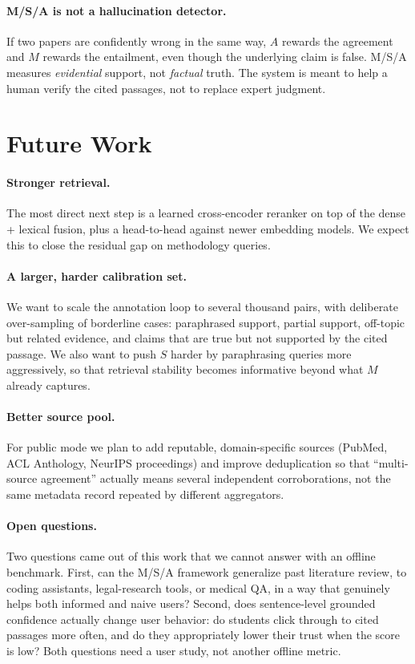 \documentclass[10pt]{article}
\begin{document}
\paragraph{M/S/A is not a hallucination detector.}
If two papers are confidently wrong in the same way, $A$ rewards the
agreement and $M$ rewards the entailment, even though the underlying
claim is false. M/S/A measures \emph{evidential} support, not
\emph{factual} truth. The system is meant to help a human verify the
cited passages, not to replace expert judgment.

\section{Future Work}
\label{sec:future}

\paragraph{Stronger retrieval.}
The most direct next step is a learned cross-encoder reranker on top
of the dense + lexical fusion, plus a head-to-head against newer
embedding models. We expect this to close the residual gap on
methodology queries.

\paragraph{A larger, harder calibration set.}
We want to scale the annotation loop to several thousand pairs, with
deliberate over-sampling of borderline cases: paraphrased support,
partial support, off-topic but related evidence, and claims that are
true but not supported by the cited passage. We also want to push
$S$ harder by paraphrasing queries more aggressively, so that
retrieval stability becomes informative beyond what $M$ already
captures.

\paragraph{Better source pool.}
For public mode we plan to add reputable, domain-specific sources
(PubMed, ACL Anthology, NeurIPS proceedings) and improve
deduplication so that ``multi-source agreement'' actually means
several independent corroborations, not the same metadata record
repeated by different aggregators.

\paragraph{Open questions.}
Two questions came out of this work that we cannot answer with an
offline benchmark. First, can the M/S/A framework generalize past
literature review, to coding assistants, legal-research tools, or
medical QA, in a way that genuinely helps both informed and naive
users? Second, does sentence-level grounded confidence actually
change user behavior: do students click through to cited passages
more often, and do they appropriately lower their trust when the
score is low? Both questions need a user study, not another offline
metric.
\end{document}
